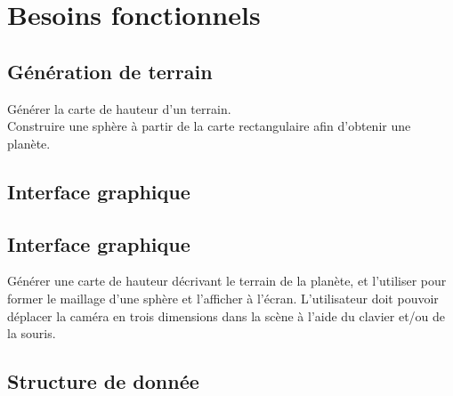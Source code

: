 \documentclass[12pt]{report}
\begin{document}



\section{Besoins fonctionnels}

\subsection{Génération de terrain}

Générer la carte de hauteur d'un terrain.\\
Construire une sphère à partir de la carte rectangulaire afin d'obtenir
une planète.


\subsection{Interface graphique}



\subsection{Interface graphique}

Générer une carte de hauteur décrivant le terrain de la planète, et l'utiliser pour former le maillage d'une sphère et l'afficher à l'écran. L'utilisateur doit pouvoir déplacer la caméra en trois dimensions dans la scène à l'aide du clavier et/ou de la souris.

\subsection{Structure de donnée}
\end{document}
